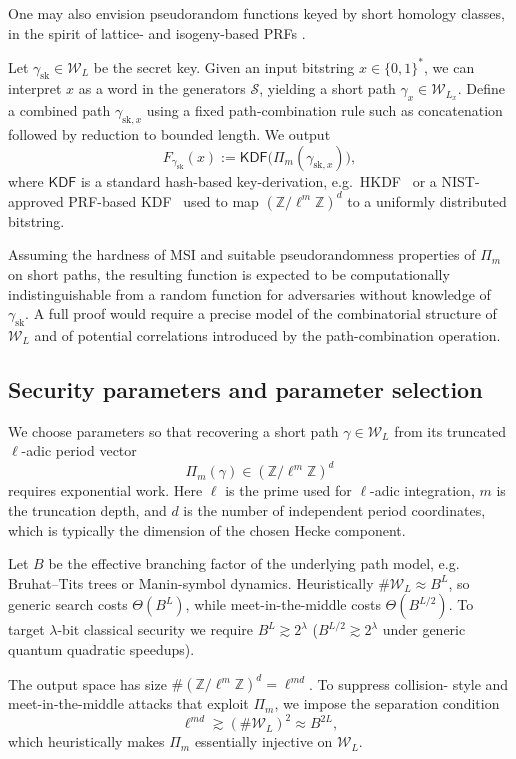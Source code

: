\documentclass[10pt]{amsart}
\theoremstyle{theostyle}
\newcommand{\ZZ}{\mathbb{Z}}
\begin{document}
One may also envision pseudorandom functions keyed by short homology classes,
in the spirit of lattice- and isogeny-based PRFs \cite{PRF:Expnader,Goldreich:PRF,NTPRFs}.

Let $\gamma_{\mathrm{sk}}\in\mathcal W_L$ be the secret key. Given an input
bitstring $x\in\{0,1\}^*$, we can interpret $x$ as a word in the generators
$\mathcal S$, yielding a short path $\gamma_x\in\mathcal W_{L_x}$. Define a
combined path $\gamma_{\mathrm{sk},x}$ using a fixed path-combination rule
such as concatenation followed by reduction to bounded length. We output
\[
F_{\gamma_{\mathrm{sk}}}(x)
:=
\mathsf{KDF}\bigl(\Pi_m(\gamma_{\mathrm{sk},x})\bigr),
\]
where $\mathsf{KDF}$ is a standard hash-based key-derivation, e.g.\ HKDF~\cite{RFC5869} or a NIST-approved PRF-based KDF~\cite{NIST800108}
used to map $(\ZZ/\ell^m\ZZ)^d$ to a uniformly distributed bitstring.

Assuming the hardness of MSI and suitable pseudorandomness properties of
$\Pi_m$ on short paths, the resulting function is expected to be
computationally indistinguishable from a random function for adversaries
without knowledge of $\gamma_{\mathrm{sk}}$. A full proof would require a
precise model of the combinatorial structure of $\mathcal W_L$ and of
potential correlations introduced by the path-combination operation.

\subsection{Security parameters and parameter selection}
\label{subsec:security-params}

We choose parameters so that recovering a short path
$\gamma\in\mathcal W_L$ from its truncated $\ell$-adic period vector
\[
\Pi_m(\gamma)\in (\ZZ/\ell^m\ZZ)^d
\]
requires exponential work.  Here $\ell$ is the prime used for $\ell$-adic
integration, $m$ is the truncation depth, and $d$ is the number of independent
period coordinates, which is typically the dimension of the chosen Hecke component.

Let $B$ be the effective branching factor of the underlying path model, e.g.\; Bruhat--Tits trees or Manin-symbol dynamics.
Heuristically $\#\mathcal W_L \approx B^L$, so generic search costs
$\Theta(B^L)$, while meet-in-the-middle costs $\Theta(B^{L/2})$.  To target
$\lambda$-bit classical security we require $B^L\gtrsim 2^\lambda$ ($B^{L/2}\gtrsim 2^\lambda$ under
generic quantum quadratic speedups).

The output space has size $\#(\ZZ/\ell^m\ZZ)^d=\ell^{md}$.  To suppress collision-
style and meet-in-the-middle attacks that exploit $\Pi_m$, we impose the separation condition
\[
\ell^{md}\gtrsim (\#\mathcal W_L)^2 \approx B^{2L},
\]
which heuristically makes $\Pi_m$ essentially injective on $\mathcal W_L$.
\end{document}
